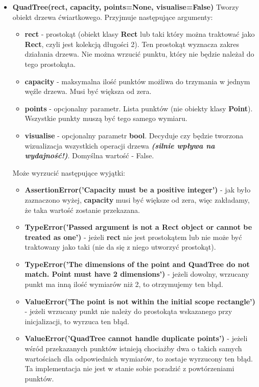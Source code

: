 \documentclass[a4paper, 12pt]{article}
\begin{document}
    \begin{itemize}
        \item \textbf{QuadTree(rect, capacity, points=None, visualise=False)} \vspace{6pt}\newline
        \quad Tworzy obiekt drzewa ćwiartkowego. Przyjmuje następujące argumenty:
        \begin{itemize}
            \item \textbf{rect} - prostokąt (obiekt klasy \textbf{Rect} lub taki który można traktować jako \textbf{Rect}, czyli jest kolekcją długości 2). Ten prostokąt wyznacza zakres działania drzewa. Nie można wrzucić punktu, który nie będzie należał do tego prostokąta.
            \item \textbf{capacity} - maksymalna ilość punktów możliwa do trzymania w jednym węźle drzewa. Musi być większa od zera.
            \item \textbf{points} - opcjonalny parametr. Lista punktów (nie obiekty klasy \textbf{Point}). Wszystkie punkty muszą być tego samego wymiaru.
            \item \textbf{visualise} - opcjonalny parametr \textbf{bool}. Decyduje czy będzie tworzona wizualizacja wszystkich operacji drzewa \textbf{\textit{(silnie wpływa na wydajność!)}}. Domyślna wartość - False.
        \end{itemize}
        
        \noindent
        \quad Może wyrzucić następujące wyjątki:
        \begin{itemize}
            \item \textbf{AssertionError('Capacity must be a positive integer')} - jak było zaznaczono wyżej, \textbf{capacity} musi być większe od zera, więc zakładamy, że taka wartość zostanie przekazana. 
            \item \textbf{TypeError('Passed argument is not a Rect object or cannot be treated as one')} - jeżeli \textbf{rect} nie jest prostokątem lub nie może być traktowany jako taki (nie da się z niego utworzyć prostokąt).
            \item \textbf{TypeError('The dimensions of the point and QuadTree do not match. Point must have 2 dimensions')} - jeżeli dowolny, wrzucany punkt ma inną ilość wymiarów niż 2, to otrzymujemy ten błąd.
            \item \textbf{ValueError('The point is not within the initial scope rectangle')} - jeżeli wrzucany punkt nie należy do prostokąta wskazanego przy inicjalizacji, to wyrzuca ten błąd.
            \item \textbf{ValueError('QuadTree cannot handle duplicate points')} - jeżeli wśród przekazanych punktów istnieją chociażby dwa o takich samych wartościach dla odpowiednich wymiarów, to zostaje wyrzucony ten błąd. Ta implementacja nie jest w stanie sobie poradzić z powtórzeniami punktów.
        \end{itemize}
        

\end{itemize}
\end{document}

